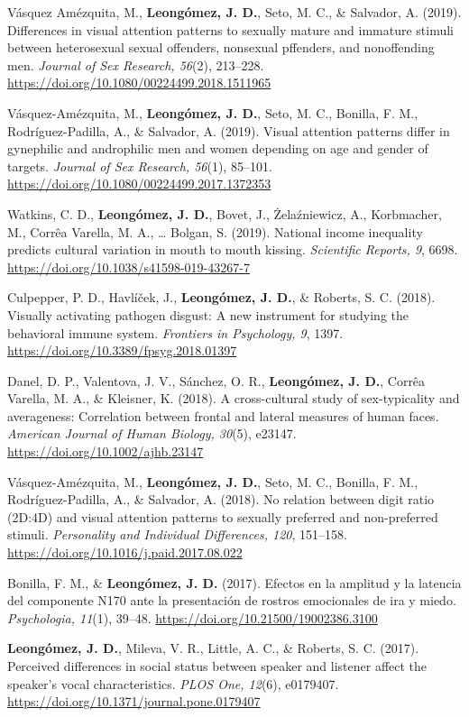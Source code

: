\documentclass[11pt,a4paper,]{awesome-cv}
\begin{document}
Vásquez Amézquita, M., \textbf{Leongómez, J. D.}, Seto, M. C., \&
Salvador, A. (2019). Differences in visual attention patterns to
sexually mature and immature stimuli between heterosexual sexual
offenders, nonsexual pffenders, and nonoffending men. \emph{Journal of
Sex Research, 56}(2), 213--228.
\url{https://doi.org/10.1080/00224499.2018.1511965}

Vásquez-Amézquita, M., \textbf{Leongómez, J. D.}, Seto, M. C., Bonilla,
F. M., Rodríguez-Padilla, A., \& Salvador, A. (2019). Visual attention
patterns differ in gynephilic and androphilic men and women depending on
age and gender of targets. \emph{Journal of Sex Research, 56}(1),
85--101. \url{https://doi.org/10.1080/00224499.2017.1372353}

Watkins, C. D., \textbf{Leongómez, J. D.}, Bovet, J., Żelaźniewicz, A.,
Korbmacher, M., Corrêa Varella, M. A., \ldots{} Bolgan, S. (2019).
National income inequality predicts cultural variation in mouth to mouth
kissing. \emph{Scientific Reports, 9}, 6698.
\url{https://doi.org/10.1038/s41598-019-43267-7}

Culpepper, P. D., Havlíček, J., \textbf{Leongómez, J. D.}, \& Roberts,
S. C. (2018). Visually activating pathogen disgust: A new instrument for
studying the behavioral immune system. \emph{Frontiers in Psychology,
9}, 1397. \url{https://doi.org/10.3389/fpsyg.2018.01397}

Danel, D. P., Valentova, J. V., Sánchez, O. R.,
\textbf{Leongómez, J. D.}, Corrêa Varella, M. A., \& Kleisner, K.
(2018). A cross-cultural study of sex-typicality and averageness:
Correlation between frontal and lateral measures of human faces.
\emph{American Journal of Human Biology, 30}(5), e23147.
\url{https://doi.org/10.1002/ajhb.23147}

Vásquez-Amézquita, M., \textbf{Leongómez, J. D.}, Seto, M. C., Bonilla,
F. M., Rodríguez-Padilla, A., \& Salvador, A. (2018). No relation
between digit ratio (2D:4D) and visual attention patterns to sexually
preferred and non-preferred stimuli. \emph{Personality and Individual
Differences, 120}, 151--158.
\url{https://doi.org/10.1016/j.paid.2017.08.022}

Bonilla, F. M., \& \textbf{Leongómez, J. D.} (2017). Efectos en la
amplitud y la latencia del componente N170 ante la presentación de
rostros emocionales de ira y miedo. \emph{Psychologia, 11}(1), 39--48.
\url{https://doi.org/10.21500/19002386.3100}

\textbf{Leongómez, J. D.}, Mileva, V. R., Little, A. C., \& Roberts, S.
C. (2017). Perceived differences in social status between speaker and
listener affect the speaker's vocal characteristics. \emph{PLOS One,
12}(6), e0179407. \url{https://doi.org/10.1371/journal.pone.0179407}
\end{document}
